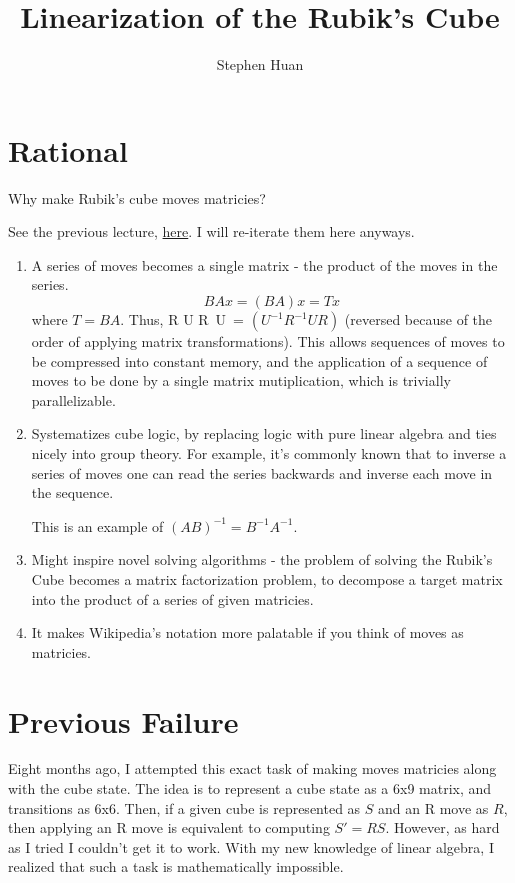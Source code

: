 \documentclass[11pt, oneside]{article}
\title{Linearization of the Rubik's Cube}
\author{Stephen Huan}
\newcommand{\dash}{\textquotesingle}
\theoremstyle{plain}
\begin{document}
\maketitle

\section{Rational}
Why make Rubik's cube moves matricies?

See the previous lecture, \href{https://activities.tjhsst.edu/cubing/static/pdfs/Matricization/matrix.pdf}{here}. I will re-iterate them here anyways.
\begin{enumerate}
  \item A series of moves becomes a single matrix - the product of the moves
  in the series.
  \[ BAx = (BA)x = Tx \] where \( T = BA \).
  Thus, R U R\dash \ U\dash \ = \( (U^{-1} R^{-1} U R) \)
  (reversed because of the order of applying matrix transformations).
  This allows sequences of moves to be compressed into constant memory,
  and the application of a sequence of moves to be done by a single matrix mutiplication,
  which is trivially parallelizable.

  \item Systematizes cube logic, by replacing logic with pure linear algebra
  and ties nicely into group theory.
  For example, it's commonly known that to inverse a series of moves
  one can read the series backwards and inverse each move in the sequence.

  This is an example of \( (AB)^{-1} = B^{-1}A^{-1} \).

  \item Might inspire novel solving algorithms - the problem of solving the Rubik's Cube
  becomes a matrix factorization problem, to decompose a target matrix into the
  product of a series of given matricies.

  \item It makes Wikipedia's notation more palatable if you think of moves as matricies.
\end{enumerate}

\section{Previous Failure}
Eight months ago, I attempted this exact task of making moves matricies along
with the cube state. The idea is to represent a cube state as a 6x9 matrix,
and transitions as 6x6. Then, if a given cube is represented as \( S \)
and an R move as \( R \), then applying an R move is equivalent to
computing \( S' = R S \). However, as hard as I tried I couldn't get it to work.
With my new knowledge of linear algebra, I realized that such a task is
mathematically impossible.
\end{document}
